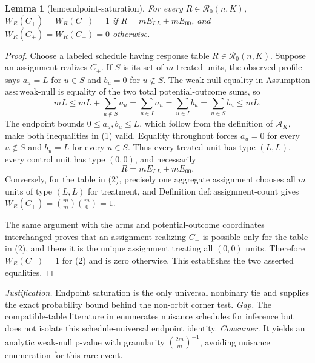 \documentclass{article}
\newtheorem{lemma}{Lemma}
\begin{document}
\begin{lemma}[lem:endpoint-saturation]\label{lem:endpoint-saturation}
For every \(R\in\mathcal R_0(n,K)\), \(W_R(C_+)=W_R(C_-)=1\) if \(R=mE_{LL}+mE_{00}\), and \(W_R(C_+)=W_R(C_-)=0\) otherwise.
\end{lemma}
\begin{proof}
Choose a labeled schedule having response table \(R\in\mathcal R_0(n,K)\).  Suppose an assignment realizes \(C_+\).  If \(S\) is its set of \(m\) treated units, the observed profile says \(a_u=L\) for \(u\in S\) and \(b_u=0\) for \(u\notin S\).  The weak-null equality in Assumption \(\mathrm{ass{:}weak\text{-}null}\) is equality of the two total potential-outcome sums, so
\[
 mL
 \leq mL+\sum_{u\notin S}a_u
 =\sum_{u\in I}a_u
 =\sum_{u\in I}b_u
 =\sum_{u\in S}b_u
 \leq mL.                                                \tag{1}
\]
The endpoint bounds \(0\leq a_u,b_u\leq L\), which follow from the definition of \(\mathcal A_K\), make both inequalities in (1) valid.  Equality throughout forces \(a_u=0\) for every \(u\notin S\) and \(b_u=L\) for every \(u\in S\).  Thus every treated unit has type \((L,L)\), every control unit has type \((0,0)\), and necessarily
\[
 R=mE_{LL}+mE_{00}.                                     \tag{2}
\]
Conversely, for the table in (2), precisely one aggregate assignment chooses all \(m\) units of type \((L,L)\) for treatment, and Definition \(\mathrm{def{:}assignment\text{-}count}\) gives \(W_R(C_+)=\binom m m\binom m0=1\).

The same argument with the arms and potential-outcome coordinates interchanged proves that an assignment realizing \(C_-\) is possible only for the table in (2), and there it is the unique assignment treating all \((0,0)\) units.  Therefore \(W_R(C_-)=1\) for (2) and is zero otherwise.  This establishes the two asserted equalities.
\end{proof}
\par\smallskip\noindent \textit{Justification.} Endpoint saturation is the only universal nonbinary tie and supplies the exact probability bound behind the non-orbit corner test. \textit{Gap.} The compatible-table literature in \cite{RigdonHudgens2015} enumerates nuisance schedules for inference but does not isolate this schedule-universal endpoint identity. \textit{Consumer.} It yields an analytic weak-null p-value with granularity \(\binom{2m}{m}^{-1}\), avoiding nuisance enumeration for this rare event.
\end{document}

